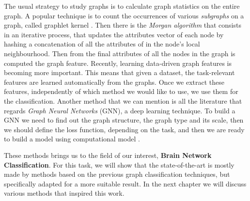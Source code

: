 The usual strategy to study graphs is to calculate graph statistics on the entire graph. A popular technique is to count the occurrences of various \textit{subgraphs} on a graph, called graphlet kernel \cite{pmlr-v5-shervashidze09a}. Then there is the \textit{Morgan algorithm} \cite{Rogers2010ECFP} that consists in an iterative process, that updates the attributes vector of each node by hashing a concatenation of all the attributes of in the node's local neighbourhood. Then from the final attributes of all the nodes in the graph is computed the graph feature. Recently, learning data-driven graph features \cite{NIPS2015_f9be311e} is becoming more important. This means that given a dataset, the task-relevant features are learned automatically from the graphs. Once we extract these features, independently of which method we would like to use, we use them for the classification.
Another method that we can mention is all the literature that regards \textit{Graph Neural Networks} (GNN), a deep learning technique. To build a GNN we need to find out the graph structure, the graph type and its scale, then we should define the loss function, depending on the task, and then we are ready to build a model using computational model \cite{ZHOU202057}. 

These methods brings us to the field of our interest, \textbf{Brain Network Classification}. For this task, we will show that the state-of-the-art is mostly made by methods based on the previous graph classification techniques, but specifically adapted for a more suitable result. In the next chapter we will discuss various methods that inspired this work.